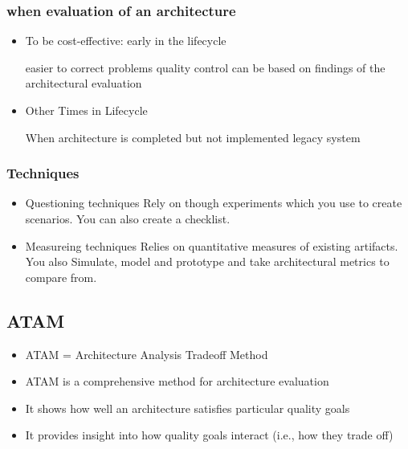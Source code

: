 \subsubsection{when evaluation of an
architecture}
\begin{itemize}
  \item To be cost-effective: early in the lifecycle

  \subitem
    easier to correct problems
  \subitem
    quality control can be based on findings of the architectural
    evaluation

  
  
 
    \item
    Other Times in Lifecycle
    
    \subitem
    When architecture is completed but not implemented
    \subitem
    legacy system
  

\end{itemize}






\subsubsection{Techniques}
\begin{itemize}
    \item 
    Questioning techniques
    \subitem 
    Rely on though experiments which you use to create scenarios. You can also create a checklist.
    
    
    \item 
    Measureing techniques
    \subitem 
    Relies on quantitative measures of existing artifacts. You also Simulate, model and prototype and take architectural metrics to compare from.
    
    
\end{itemize}














\hypertarget{atam}{%
\subsection{ATAM}\label{atam}}

\begin{itemize}
\tightlist
\item
  ATAM = Architecture Analysis Tradeoff Method
\item
  ATAM is a comprehensive method for architecture evaluation
\item
  It shows how well an architecture satisfies particular quality goals
\item
  It provides insight into how quality goals interact (i.e., how they
  trade off)
\end{itemize}

